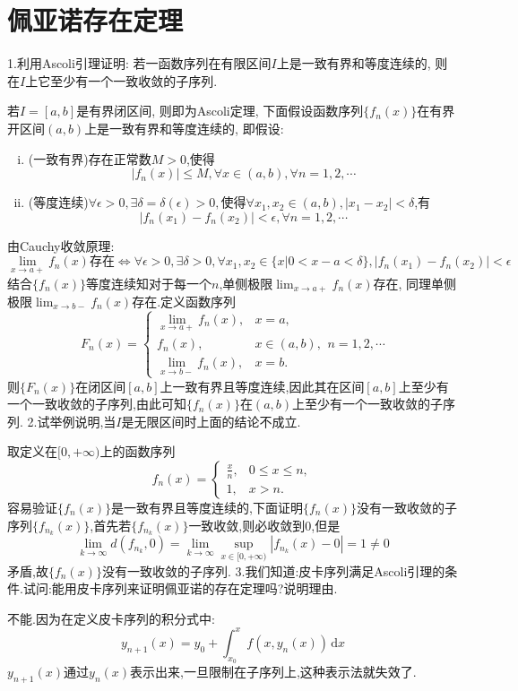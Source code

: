 \documentclass[titlepage,11pt,a4paper,twoside]{report}
\makeatletter
\newcommand\diff{\,\mathrm{d}}
\renewenvironment{proof}{\par
	\pushQED{\qed}%
	\normalfont \topsep1\p@\@plus6\p@\relax
	\trivlist
	\item\relax
	{\hspace*{\parindent}{\heiti 证明}\@addpunct{:}}\hspace\labelsep\ignorespaces
}{%
	\popQED\endtrivlist\@endpefalse
}
\newenvironment{solve}{\par
	\pushQED{\qed}%
	\normalfont \topsep1\p@\@plus6\p@\relax
	\trivlist
	\item\relax
	{\hspace*{\parindent}{\heiti 解}\@addpunct{:}}\hspace\labelsep\ignorespaces
}{%
	\popQED\endtrivlist\@endpefalse
}
\makeatother
\begin{document}
\section{佩亚诺存在定理}
1.利用Ascoli引理证明: 若一函数序列在有限区间$I$上是一致有界和等度连续的, 则在$I$上它至少有一个一致收敛的子序列.
\begin{proof}
若$I=[a,b]$是有界闭区间, 则即为Ascoli定理, 下面假设函数序列$\{f_n(x)\}$在有界开区间$(a,b)$上是一致有界和等度连续的, 即假设:
\begin{enumerate}[(i)]
\item (一致有界)存在正常数$M>0$,使得
\[|f_n(x)|\leq M,\forall x\in(a,b),\forall n=1,2,\cdots\]
\item (等度连续)$\forall\epsilon>0,\exists\delta=\delta(\epsilon)>0,$使得$\forall x_1,x_2\in(a,b),|x_1-x_2|<\delta$,有
\[|f_n(x_1)-f_n(x_2)|<\epsilon,\forall n=1,2,\cdots\]
\end{enumerate}
由Cauchy收敛原理:
\[\lim_{x\to a+}f_n(x)存在\Leftrightarrow\forall\epsilon>0,\exists\delta>0,\forall x_1,x_2\in\{x|0<x-a<\delta\},|f_n(x_1)-f_n(x_2)|<\epsilon\]
结合$\{f_n(x)\}$等度连续知对于每一个$n$,单侧极限$\displaystyle\lim_{x\to a+}f_n(x)$存在, 同理单侧极限$\displaystyle\lim_{x\to b-}f_n(x)$存在.定义函数序列
\[F_n(x)=\begin{cases}
\lim\limits_{x\to a+}f_n(x),&x=a,\\
f_n(x),&x\in (a,b),\\
\lim\limits_{x\to b-}f_n(x),&x=b.
\end{cases}n=1,2,\cdots\]
则$\{F_n(x)\}$在闭区间$[a,b]$上一致有界且等度连续,因此其在区间$[a,b]$上至少有一个一致收敛的子序列,由此可知$\{f_n(x)\}$在$(a,b)$上至少有一个一致收敛的子序列.
\end{proof}
2.试举例说明,当$I$是无限区间时上面的结论不成立.
\begin{solve}
取定义在$[0,+\infty)$上的函数序列
\[f_n(x)=\begin{cases}
\frac{x}{n},&0\leq x\leq n,\\
1,&x>n.
\end{cases}\]
容易验证$\{f_n(x)\}$是一致有界且等度连续的,下面证明$\{f_n(x)\}$没有一致收敛的子序列$\{f_{n_k}(x)\}$,首先若$\{f_{n_k}(x)\}$一致收敛,则必收敛到0,但是
\[\lim_{k\to\infty}d(f_{n_k},0)=\lim_{k\to\infty}\sup_{x\in[0,+\infty)}|f_{n_k}(x)-0|=1\neq0\]
矛盾,故$\{f_n(x)\}$没有一致收敛的子序列.
\end{solve}
3.我们知道:皮卡序列满足Ascoli引理的条件.试问:能用皮卡序列来证明佩亚诺的存在定理吗?说明理由.
\begin{solve}
不能.因为在定义皮卡序列的积分式中:
\[y_{n+1}(x)=y_0+\int_{x_0}^xf(x,y_n(x))\diff x\]
$y_{n+1}(x)$通过$y_n(x)$表示出来,一旦限制在子序列上,这种表示法就失效了.
\end{solve}
\end{document}
